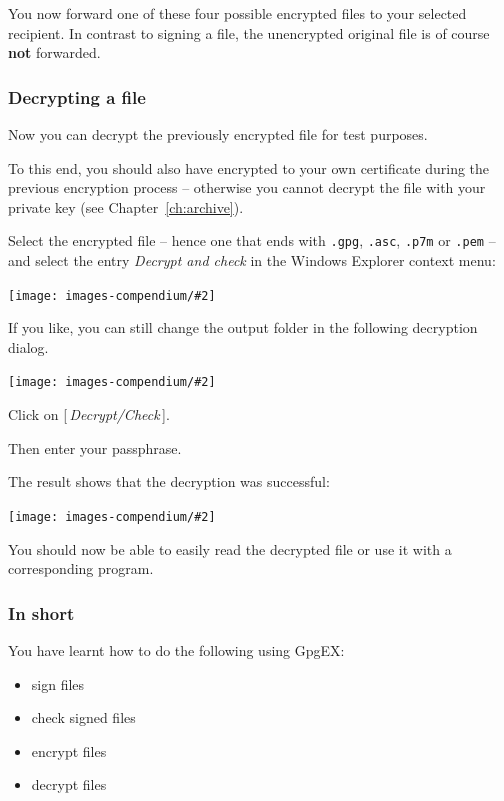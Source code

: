 \documentclass[a4paper,11pt,oneside,openright,titlepage]{scrbook}
\newcommand{\Button}[1]{[\,\textit{#1}\,]}
\newcommand{\Menu}[1]{\textit{#1}}
\newcommand{\Filename}[1]{\small{\texttt{#1}}\normalsize}
\newcommand{\IncludeImage}[2][]{
\begin{center}
  \texttt{[image: images-compendium/\#2]}%
\end{center}
}
\begin{document}
You now forward one of these four possible encrypted files to your selected recipient. In contrast to signing a file, the unencrypted original file is of course \textbf{not} forwarded.


\clearpage
\subsubsection{Decrypting a file}
Now you can decrypt the previously encrypted file for test purposes.

To this end, you should also have encrypted to your own certificate
during the previous encryption process -- otherwise you cannot decrypt
the file with your private key (see Chapter~\ref{ch:archive}).

Select the encrypted file -- hence one that ends with \Filename{.gpg},
\Filename{.asc}, \Filename{.p7m} or \Filename{.pem} -- and select
the entry \Menu{Decrypt and check} in the Windows Explorer context
menu:

\IncludeImage[width=0.3\textwidth]{sc-gpgex-contextmenu-verifyDecrypt_en}

\clearpage
If you like, you can still change the output folder in the following
decryption dialog.

\IncludeImage[width=0.85\textwidth]{sc-kleopatra-decryptFile1_en}

Click on \Button{Decrypt/Check}.

Then enter your passphrase.

\clearpage
The result shows that the decryption was successful:

\IncludeImage[width=0.85\textwidth]{sc-kleopatra-decryptFile2_en}

You should now be able to easily read the decrypted file or use it
with a corresponding program.

\clearpage
\subsubsection{In short}
You have learnt how to do the following using GpgEX:
\begin{itemize}
    \item sign files
    \item check signed files
    \item encrypt files
    \item decrypt files
\end{itemize}
\end{document}

